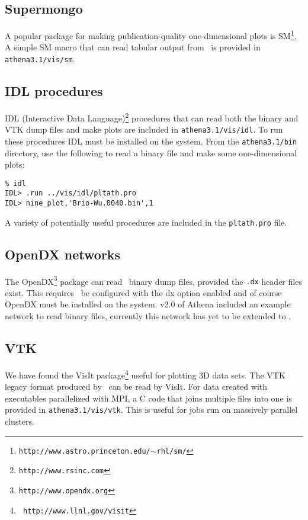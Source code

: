 \subsection{Supermongo}

A popular package for making publication-quality one-dimensional plots
is SM\footnote{{\tt http://www.astro.princeton.edu/$\sim$rhl/sm/}}.  A simple
SM macro that can read tabular output from \ath\ is provided in {\tt
athena3.1/vis/sm}.

\subsection{IDL procedures}

IDL (Interactive Data Language)\footnote{{\tt http://www.rsinc.com}}
procedures that can read both the binary and VTK dump files and make plots
are included in {\tt athena3.1/vis/idl}.  To run these procedures
IDL must be installed on the system.  From the {\tt athena3.1/bin} directory, use
the following to read a binary file and make some one-dimensional plots:
\begin{verbatim}
% idl
IDL> .run ../vis/idl/pltath.pro 
IDL> nine_plot,'Brio-Wu.0040.bin',1
\end{verbatim}
A variety of potentially useful
procedures are included in the {\tt pltath.pro} file.

\subsection{OpenDX networks}

The OpenDX\footnote{{\tt http://www.opendx.org}} package can
read \ath\ binary dump files, provided the {\tt .dx} header files exist.
This requires \ath\ be configured with the dx option enabled and of
course OpenDX must be installed on the system.  v2.0 of Athena included
an example network to read binary files, currently this network
has yet to be extended to \ath.

\subsection{VTK}

We have found the VisIt package\footnote{{\tt
http://www.llnl.gov/visit}} useful for plotting 3D data sets.  The VTK legacy
format produced by \ath\ can be read by VisIt.  For data created with
executables parallelized with MPI, a C code that joins multiple files into
one is provided in {\tt athena3.1/vis/vtk}.  This is useful for jobs run
on massively parallel clusters.

